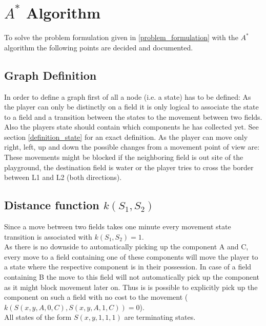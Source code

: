 \documentclass{article}
\begin{document}
\section{$A^*$ Algorithm}
To solve the problem formulation given in \ref{problem_formulation} with the $A^*$ algorithm the following points are decided and documented.

\subsection{Graph Definition}
In order to define a graph first of all a node (i.e. a state) has to be defined: As the player can only be distinctly on a field it is only logical to associate the state to a field and a transition between the states to the movement between two fields. Also the players state should contain which components he has collected yet. See section \ref{definition_state} for an exact definition. As the player can move only right, left, up and down the possible changes from a movement point of view are:
These movements might be blocked if the neighboring field is out site of the playground, the destination field is water or the player tries to cross the border between L1 and L2 (both directions).
\subsection{Distance function  $k(S_1, S_2)$}
Since a move between two fields takes one minute every movement state transition is associated with $k(S_1, S_2) = 1$.\\
As there is no downside to automatically picking up the component A and C, every move to a field containing one of these components will move the player to a state where the respective component is in their possession. In case of a field containing B the move to this field will not automatically pick up the component as it might block movement later on. Thus is is possible to explicitly pick up the component on such a field with no cost to the movement ($k(S(x,y,A,0,C), S(x,y,A,1,C)) = 0$).\\
All states of the form $S(x,y,1,1,1)$ are terminating states.
\end{document}
